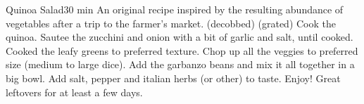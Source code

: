 \begin{recipe}{Quinoa Salad}{}{30 min}
\freeform An original recipe inspired by the resulting abundance of vegetables after a trip to the farmer's market.
\freeform (decobbed)
\freeform (grated)
Cook the quinoa. Sautee the zucchini and onion with a bit of garlic and salt, until cooked. Cooked the leafy greens to preferred texture. Chop up all the veggies to preferred size (medium to large dice). Add the garbanzo beans and mix it all together in a big bowl. Add salt, pepper and italian herbs (or other) to taste. Enjoy! Great leftovers for at least a few days.
\end{recipe}
